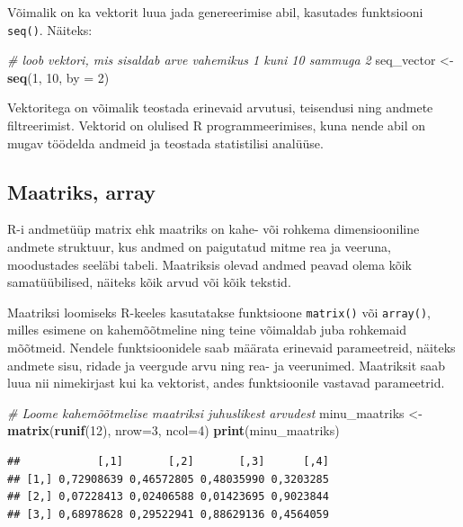\documentclass[
]{book}
\newenvironment{Shaded}{\begin{snugshade}}{\end{snugshade}}
\newcommand{\AttributeTok}[1]{\textcolor[rgb]{0.13,0.29,0.53}{#1}}
\newcommand{\CommentTok}[1]{\textcolor[rgb]{0.56,0.35,0.01}{\textit{#1}}}
\newcommand{\DecValTok}[1]{\textcolor[rgb]{0.00,0.00,0.81}{#1}}
\newcommand{\FunctionTok}[1]{\textcolor[rgb]{0.13,0.29,0.53}{\textbf{#1}}}
\newcommand{\NormalTok}[1]{#1}
\newcommand{\OtherTok}[1]{\textcolor[rgb]{0.56,0.35,0.01}{#1}}
\renewenvironment{Shaded} {\begin{snugshade}\footnotesize} {\end{snugshade}}
\begin{document}
Võimalik on ka vektorit luua jada genereerimise abil, kasutades funktsiooni \texttt{seq()}. Näiteks:

\begin{Shaded}
\begin{Highlighting}[]
\CommentTok{\# loob vektori, mis sisaldab arve vahemikus 1 kuni 10 sammuga 2}
\NormalTok{seq\_vector }\OtherTok{\textless{}{-}} \FunctionTok{seq}\NormalTok{(}\DecValTok{1}\NormalTok{, }\DecValTok{10}\NormalTok{, }\AttributeTok{by =} \DecValTok{2}\NormalTok{) }
\end{Highlighting}
\end{Shaded}

Vektoritega on võimalik teostada erinevaid arvutusi, teisendusi ning andmete filtreerimist. Vektorid on olulised R programmeerimises, kuna nende abil on mugav töödelda andmeid ja teostada statistilisi analüüse.

\subsection{Maatriks, array}\label{maatriks-array}

R-i andmetüüp matrix ehk maatriks on kahe- või rohkema dimensiooniline andmete struktuur, kus andmed on paigutatud mitme rea ja veeruna, moodustades seeläbi tabeli. Maatriksis olevad andmed peavad olema kõik samatüübilised, näiteks kõik arvud või kõik tekstid.

Maatriksi loomiseks R-keeles kasutatakse funktsioone \texttt{matrix()} või \texttt{array()}, milles esimene on kahemõõtmeline ning teine võimaldab juba rohkemaid mõõtmeid. Nendele funktsioonidele saab määrata erinevaid parameetreid, näiteks andmete sisu, ridade ja veergude arvu ning rea- ja veerunimed. Maatriksit saab luua nii nimekirjast kui ka vektorist, andes funktsioonile vastavad parameetrid.

\begin{Shaded}
\begin{Highlighting}[]
\CommentTok{\# Loome kahemõõtmelise maatriksi juhuslikest arvudest}
\NormalTok{minu\_maatriks }\OtherTok{\textless{}{-}} \FunctionTok{matrix}\NormalTok{(}\FunctionTok{runif}\NormalTok{(}\DecValTok{12}\NormalTok{), }\AttributeTok{nrow=}\DecValTok{3}\NormalTok{, }\AttributeTok{ncol=}\DecValTok{4}\NormalTok{)}
\FunctionTok{print}\NormalTok{(minu\_maatriks)}
\end{Highlighting}
\end{Shaded}

\begin{verbatim}
##            [,1]       [,2]       [,3]      [,4]
## [1,] 0,72908639 0,46572805 0,48035990 0,3203285
## [2,] 0,07228413 0,02406588 0,01423695 0,9023844
## [3,] 0,68978628 0,29522941 0,88629136 0,4564059
\end{verbatim}
\end{document}
